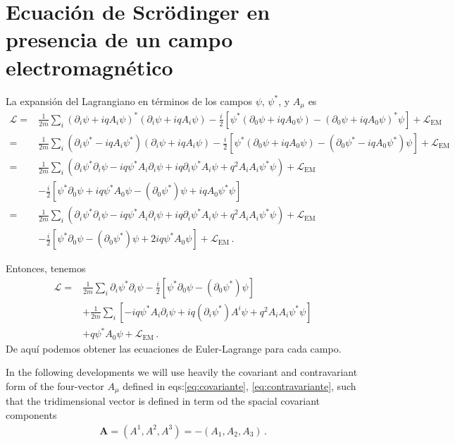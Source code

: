 \section{Ecuación de Scrödinger en presencia de un campo electromagnético}

La expansión del Lagrangiano en términos de los campos $\psi$, $\psi^*$, y $A_\mu$ es %
\begin{align}
\label{eq:178qft}
   \mathcal{L}
=&\frac{1}{2m}\sum_i\left(\partial_i\psi+i q A_i\psi\right)^*\left(\partial_i\psi+i q A_i\psi\right)-\frac{i}{2}
  \left[\psi^*\left(\partial_0\psi+i q A_0\psi\right)-\left(\partial_0\psi+i q A_0\psi\right)^*\psi\right]+\mathcal{L}_{\text{EM}} 
\nonumber\\
=&\frac{1}{2m}\sum_i\left(\partial_i\psi^*-i q A_i\psi^*\right)\left(\partial_i\psi+i q A_i\psi\right)-\frac{i}{2}
  \left[\psi^*\left(\partial_0\psi+i q A_0\psi\right)-\left(\partial_0\psi^*-i q A_0\psi^*\right)\psi\right]+\mathcal{L}_{\text{EM}}
\nonumber\\
 =&\frac{1}{2m}\sum_i\left(\partial_i\psi^*\partial_i\psi-i q \psi^*A_i\partial_i\psi+i q \partial_i\psi^*A_i\psi+q^2A_i A_i \psi^*\psi\right)
+\mathcal{L}_{\text{EM}}
\nonumber\\
 &-\frac{i}{2}
  \left[\psi^*\partial_0\psi+i q \psi^*A_0\psi-(\partial_0\psi^*)\psi+i q A_0\psi^*\psi\right]\nonumber\\
 =&\frac{1}{2m}\sum_i\left(\partial_i\psi^*\partial_i\psi-i q \psi^*A_i\partial_i\psi+i q \partial_i\psi^*A_i\psi+q^2A_i A_i \psi^*\psi\right)
+\mathcal{L}_{\text{EM}}
\nonumber\\
 &-\frac{i}{2}
  \left[\psi^*\partial_0\psi-(\partial_0\psi^*)\psi+2 i q \psi^*A_0\psi\right]+\mathcal{L}_{\text{EM}}\,.
 \end{align}

Entonces, tenemos
\begin{align}
  \mathcal{L}=&\frac{1}{2m}\sum_i\partial_i\psi^*\partial_i\psi
-\frac{i}{2}
  \left[\psi^*\partial_0\psi-(\partial_0\psi^*)\psi\right] \nonumber\\
&+\frac{1}{2m}\sum_i\left[ -i q \psi^*A_i\partial_i\psi+i q \left(\partial_i\psi^*\right) A^i\psi+q^2A_i A_i \psi^*\psi\right]\nonumber\\
 &+ q \psi^*A_0\psi+\mathcal{L}_{\text{EM}}\,.
 \end{align}
De aquí podemos obtener las ecuaciones de Euler-Lagrange para cada campo.

In the following developments we will use heavily  the covariant and contravariant form of the four-vector $A_{\mu}$ defined in eqs:\eqref{eq:covariante}, \eqref{eq:contravariante}, such that the tridimensional vector is defined in term od the spacial covariant components
\begin{align*}
  \mathbf{A}=\left( A^1,A^2,A^3\right)=-\left( A_1,A_2,A_3\right)\,.
\end{align*}

